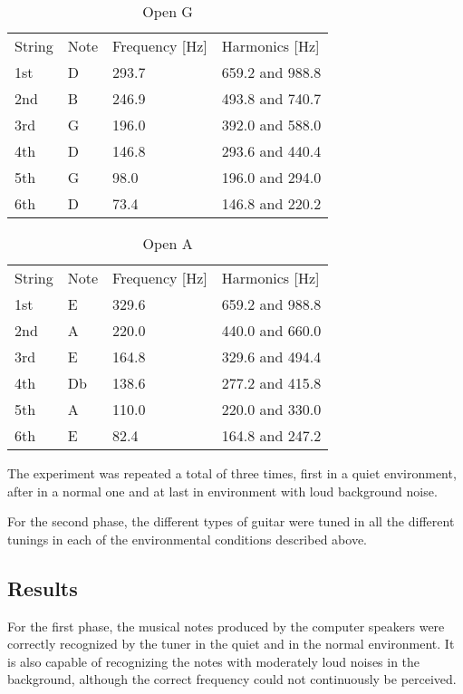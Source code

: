 \begin{table}[H]
\centering
\caption{Open G}
\label{open_g}
\begin{tabular}{llll}
String & Note & Frequency [Hz] & Harmonics [Hz] \\
1st    & D    & 293.7     & 659.2 and 988.8 \\
2nd   & B     & 246.9     & 493.8 and 740.7 \\
3rd    & G    & 196.0    &  392.0 and 588.0 \\
4th    & D    & 146.8    &  293.6 and 440.4 \\
5th    & G    & 98.0     &  196.0 and 294.0 \\
6th    & D    & 73.4      & 146.8 and 220.2
\end{tabular}
\end{table}

\begin{table}[H]
\centering
\caption{Open A}
\label{open_a}
\begin{tabular}{llll}
String & Note & Frequency [Hz] & Harmonics [Hz] \\
1st    & E    & 329.6   & 659.2 and 988.8 \\
2nd   & A    & 220.0   &  440.0 and 660.0 \\
3rd    & E    & 164.8   &  329.6 and 494.4 \\
4th    & Db  & 138.6   &  277.2 and 415.8 \\
5th    & A    & 110.0   &  220.0 and 330.0 \\
6th    & E    & 82.4     & 164.8 and 247.2
\end{tabular}
\end{table}


The experiment was repeated a total of three times, first in a quiet environment, after in a normal one and at last in environment with loud background noise.

For the second phase, the different types of guitar were tuned in all the different tunings in each of the environmental conditions described above.

\subsection{Results}
For the first phase, the musical notes produced by the computer speakers were correctly recognized by the tuner in the quiet and in the normal environment. It is also capable of recognizing the notes with moderately loud noises in the background, although the correct frequency could not continuously be perceived.

